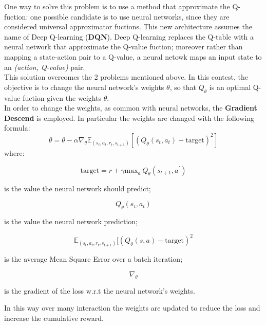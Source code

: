 \documentclass[14pt]{extarticle}
\def\pp{\vspace{10pt}\newline}
\def\ppn{\vspace{10pt}}
\begin{document}
\begin{flushleft}
\ppn
One way to solve this problem is to use a method that approximate the Q-fuction: one possible candidate is to use neural networks, since they are considered universal approximator fuctions. This new architecture assumes the name of Deep Q-learning (\textbf{DQN}). Deep Q-learning replaces the Q-table with a neural network that approximate the Q-value fuction; moreover rather than mapping a state-action pair to a Q-value, a neural netowk maps an input state to an \emph{(action, Q-value)} pair.
\\
This solution overcomes the 2 problems mentioned above.
\pp
In this contest, the objective is to change the neural network's weights $\theta$, so that $Q_{\theta}$ is an optimal Q-value fuction given the weights $\theta$. \\
In order to change the weights, as common with neural networks, the \textbf{Gradient Descend} is employed. In particular the weights are changed with the following formula:
\[ \theta = \theta - \alpha\nabla_{\theta}\mathbb{E}_{(s_t,a_t,r_t,s_{t+1})}[(Q_{\theta}(s_t,a_t) - \text{target})^2]\]
where:

\begin{equation} \label{eq:target}
\text{target} = r + \gamma\text{max}_{a^\prime}Q_{\theta}(s_{t+1},a^{\prime})
\end{equation}
\vspace{-10mm}
\begin{center}
is the value the neural network should predict;
\end{center}

\[Q_{\theta}(s_t,a_t)\]
\vspace{-10mm}
\begin{center}
is the value the neural network prediction;
\end{center}

\[\mathbb{E}_{(s_t,a_t,r_t,s_{t+1})}[(Q_{\theta}(s,a) - \text{target})^2\] 
\vspace{-10mm}
\begin{center}
is the average Mean Square Error over a batch iteration;
\end{center}

\[\nabla_{\theta}\]
\vspace{-10mm}
\begin{center}
is the gradient of the loss w.r.t the neural network's weights.
\end{center}

In this way over many interaction the weights are updated to reduce the loss and increase the cumulative reward. 
\end{flushleft}
\end{document}
